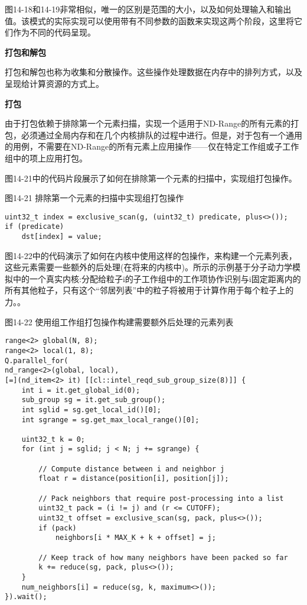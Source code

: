 图14-18和14-19非常相似，唯一的区别是范围的大小，以及如何处理输入和输出值。该模式的实际实现可以使用带有不同参数的函数来实现这两个阶段，这里将它们作为不同的代码呈现。\par

\hspace*{\fill} \par %
\textbf{打包和解包}

打包和解包也称为收集和分散操作。这些操作处理数据在内存中的排列方式，以及呈现给计算资源的方式上。\par

\hspace*{\fill} \par %
\textbf{打包}

由于打包依赖于排除第一个元素扫描，实现一个适用于ND-Range的所有元素的打包，必须通过全局内存和在几个内核排队的过程中进行。但是，对于包有一个通用的用例，不需要在ND-Range的所有元素上应用操作——仅在特定工作组或子工作组中的项上应用打包。\par

图14-21中的代码片段展示了如何在排除第一个元素的扫描中，实现组打包操作。\par

\hspace*{\fill} \par %
图14-21 排除第一个元素的扫描中实现组打包操作
\begin{lstlisting}[caption={}]
uint32_t index = exclusive_scan(g, (uint32_t) predicate, plus<>());
if (predicate)
	dst[index] = value;
\end{lstlisting}

图14-22中的代码演示了如何在内核中使用这样的包操作，来构建一个元素列表，这些元素需要一些额外的后处理(在将来的内核中)。所示的示例基于分子动力学模拟中的一个真实内核:分配给粒子i的子工作组中的工作项协作识别与i固定距离内的所有其他粒子，只有这个“邻居列表”中的粒子将被用于计算作用于每个粒子上的力。。\par

\hspace*{\fill} \par %
图14-22 使用组工作组打包操作构建需要额外后处理的元素列表
\begin{lstlisting}[caption={}]
range<2> global(N, 8);
range<2> local(1, 8);
Q.parallel_for(
nd_range<2>(global, local),
[=](nd_item<2> it) [[cl::intel_reqd_sub_group_size(8)]] {
	int i = it.get_global_id(0);
	sub_group sg = it.get_sub_group();
	int sglid = sg.get_local_id()[0];
	int sgrange = sg.get_max_local_range()[0];
	
	uint32_t k = 0;
	for (int j = sglid; j < N; j += sgrange) {
		
		// Compute distance between i and neighbor j
		float r = distance(position[i], position[j]);
		
		// Pack neighbors that require post-processing into a list
		uint32_t pack = (i != j) and (r <= CUTOFF);
		uint32_t offset = exclusive_scan(sg, pack, plus<>());
		if (pack)
			neighbors[i * MAX_K + k + offset] = j;
		
		// Keep track of how many neighbors have been packed so far
		k += reduce(sg, pack, plus<>());
	}
	num_neighbors[i] = reduce(sg, k, maximum<>());
}).wait();
\end{lstlisting}

